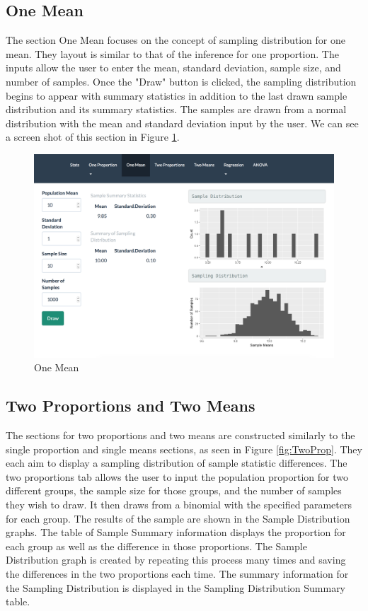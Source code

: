 \documentclass[11pt]{book}
\begin{document}
\newpage
\subsection{One Mean}
The section One Mean focuses on the concept of sampling distribution for one mean. They layout is similar to that of the inference for one proportion.  The inputs allow the user to enter the mean, standard deviation, sample size, and number of samples.  Once the "Draw" button is clicked, the sampling distribution begins to appear with summary statistics in addition to the last drawn sample distribution and its summary statistics. The samples are drawn from a normal distribution with the mean and standard deviation input by the user.   We can see a screen shot of this section in Figure \ref{fig:OneMean}.


\begin{figure}
\centering
        \includegraphics[width=\textwidth]{OneMean.png}
        \caption{One Mean}
        \label{fig:OneMean}
        
\end{figure}

\subsection{Two Proportions and Two Means}

The sections for two proportions and two means are constructed similarly to the single proportion and single means sections, as seen in Figure \ref{fig:TwoProp}.  They each aim to display a sampling distribution of sample statistic differences. The two proportions tab allows the user to input the population proportion for two different groups, the sample size for those groups, and the number of samples they wish to draw. It then draws from a binomial with the specified parameters for each group. The results of the sample are shown in the Sample Distribution graphs. The table of Sample Summary information displays the proportion for each group as well as the difference in those proportions. The Sample Distribution graph is created by repeating this process many times and saving the differences in the two proportions each time. The summary information for the Sampling Distribution is displayed in the Sampling Distribution Summary table.
\end{document}
